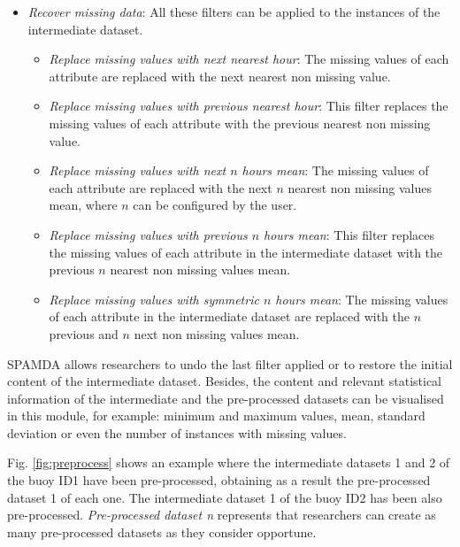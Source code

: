 \documentclass[energies,article,submit,moreauthors,pdftex]{Definitions/mdpi}
\begin{document}
\begin{itemize}
				 \item \textit{Recover missing data}: All these filters can be applied to the instances of the intermediate dataset.
					\begin{itemize}
						\item \textit{Replace missing values with next nearest hour}: The missing values of each attribute are replaced with the next nearest non missing value.
						\item \textit{Replace missing values with previous nearest hour}: This filter replaces the missing values of each attribute with the previous nearest non missing value.
						\item \textit{Replace missing values with next $n$ hours mean}: The missing values of each attribute are replaced with the next $n$ nearest non missing values mean, where $n$ can be configured by the user.
						\item \textit{Replace missing values with previous $n$ hours mean}: This filter replaces the missing values of each attribute in the intermediate dataset with the previous $n$ nearest non missing values mean.
						\item \textit{Replace missing values with symmetric $n$ hours mean}: The missing values of each attribute in the intermediate dataset are replaced with the $n$ previous and $n$ next non missing values mean.
					\end{itemize}
				 
				\end{itemize}
				
				SPAMDA allows researchers to undo the last filter applied or to restore the initial content of the intermediate dataset. Besides, the content and relevant statistical information of the intermediate and the pre-processed datasets can be visualised in this module, for example: minimum and maximum values, mean, standard deviation or even the number of instances with missing values.
				
				Fig. \ref{fig:preprocess} shows an example where the intermediate datasets 1 and 2 of the buoy ID1 have been pre-processed, obtaining as a result the pre-processed dataset 1 of each one. The intermediate dataset 1 of the buoy ID2 has been also pre-processed. \textit{Pre-processed dataset n} represents that researchers can create as many pre-processed datasets as they consider opportune.
				
\end{document}
